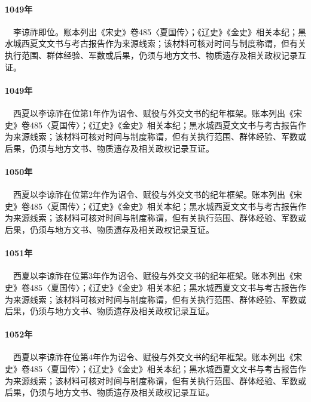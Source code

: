 \paragraph{1049年}　李谅祚即位。账本列出《宋史》卷485〈夏国传〉；《辽史》《金史》相关本纪；黑水城西夏文文书与考古报告作为来源线索；该材料可核对时间与制度称谓，但有关执行范围、群体经验、军数或后果，仍须与地方文书、物质遗存及相关政权记录互证。

\paragraph{1049年}　西夏以李谅祚在位第1年作为诏令、赋役与外交文书的纪年框架。账本列出《宋史》卷485〈夏国传〉；《辽史》《金史》相关本纪；黑水城西夏文文书与考古报告作为来源线索；该材料可核对时间与制度称谓，但有关执行范围、群体经验、军数或后果，仍须与地方文书、物质遗存及相关政权记录互证。

\paragraph{1050年}　西夏以李谅祚在位第2年作为诏令、赋役与外交文书的纪年框架。账本列出《宋史》卷485〈夏国传〉；《辽史》《金史》相关本纪；黑水城西夏文文书与考古报告作为来源线索；该材料可核对时间与制度称谓，但有关执行范围、群体经验、军数或后果，仍须与地方文书、物质遗存及相关政权记录互证。

\paragraph{1051年}　西夏以李谅祚在位第3年作为诏令、赋役与外交文书的纪年框架。账本列出《宋史》卷485〈夏国传〉；《辽史》《金史》相关本纪；黑水城西夏文文书与考古报告作为来源线索；该材料可核对时间与制度称谓，但有关执行范围、群体经验、军数或后果，仍须与地方文书、物质遗存及相关政权记录互证。

\paragraph{1052年}　西夏以李谅祚在位第4年作为诏令、赋役与外交文书的纪年框架。账本列出《宋史》卷485〈夏国传〉；《辽史》《金史》相关本纪；黑水城西夏文文书与考古报告作为来源线索；该材料可核对时间与制度称谓，但有关执行范围、群体经验、军数或后果，仍须与地方文书、物质遗存及相关政权记录互证。

